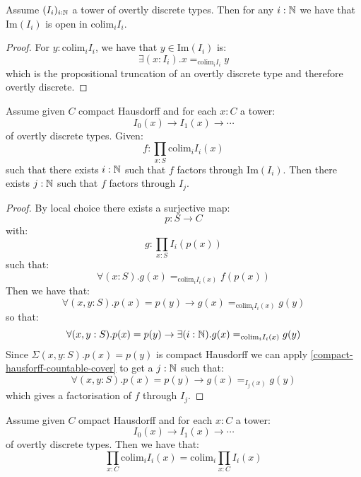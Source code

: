 \begin{lemma}\label{overtly-discrete-union-open}
Assume $(I_i)_{i:\mathbb{N}}$ a tower of overtly discrete types. Then for any $i:\mathbb{N}$ we have that $\mathrm{Im}(I_i)$ is open in $\mathrm{colim}_i I_i$. 
\end{lemma}

\begin{proof}
For $y:\mathrm{colim}_iI_i$, we have that $y\in \mathrm{Im}(I_i)$ is:
\[\exists(x:I_i). x=_{\mathrm{colim}_iI_i}y\]
which is the propositional truncation of an overtly discrete type and therefore overtly discrete.
\end{proof}


\begin{lemma}\label{factorisation-image-true-factorisation}
Assume given $C$ compact Hausdorff and for each $x:C$ a tower:
\[I_0(x)\to I_1(x)\to \cdots\]
of overtly discrete types. Given:
\[f:\prod_{x:S}\mathrm{colim}_i I_i(x)\]
such that there exists $i:\mathbb{N}$ such that $f$ factors through $\mathrm{Im}(I_i)$. Then there exists $j:\mathbb{N}$ such that $f$ factors through $I_j$.
\end{lemma}

\begin{proof}
By local choice there exists a surjective map:
\[p:S\to C\]
with:
\[g:\prod_{x:S} I_i(p(x))\]
such that:
\[\forall(x:S). g(x) =_{\mathrm{colim}_i I_i(x)} f(p(x))\]
Then we have that:
\[\forall(x,y:S). p(x)=p(y) \to g(x) =_{\mathrm{colim}_i I_i(x)} g(y)\]
so that:
\[\forall(x,y:S). p(x)=p(y) \to \exists(i:\mathbb{N}). g(x) =_{\mathrm{colim}_i I_i(x)} g(y)\]
Since $\Sigma(x,y:S). p(x)=p(y)$ is compact Hausdorff we can apply \cref{compact-hausforff-countable-cover} to get a $j:\mathbb{N}$ such that:
\[\forall(x,y:S). p(x)=p(y) \to g(x) =_{I_j(x)} g(y)\]
which gives a factorisation of $f$ through $I_j$.
\end{proof}

\begin{lemma}\label{scott-continuity-right}
Assume given $C$ ompact Hausdorff and for each $x:C$ a tower:
\[I_0(x)\to I_1(x)\to \cdots\]
of overtly discrete types. Then we have that:
\[\prod_{x:C} \mathrm{colim}_{i} I_i(x) = \mathrm{colim}_{i} \prod_{x:C} I_i(x)\]
\end{lemma}

